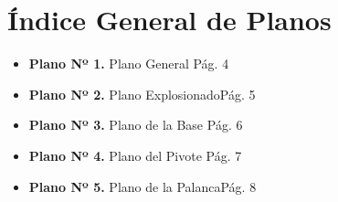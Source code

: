 \documentclass[11pt,a4paper]{article}
\begin{document}
\section*{Índice General de Planos}
\vspace{0.6cm}

\begin{itemize}[label={}, leftmargin=0.5cm, itemsep=0.8em]
    \item \textbf{Plano Nº 1.} Plano General \dotfill Pág. 4
    \item \textbf{Plano Nº 2.} Plano Explosionado\dotfill Pág. 5
    \item \textbf{Plano Nº 3.} Plano de la Base \dotfill Pág. 6
    \item \textbf{Plano Nº 4.} Plano del Pivote \dotfill Pág. 7
    \item \textbf{Plano Nº 5.} Plano de la Palanca\dotfill Pág. 8
\end{itemize}

\vspace{2.5cm}
\end{document}

